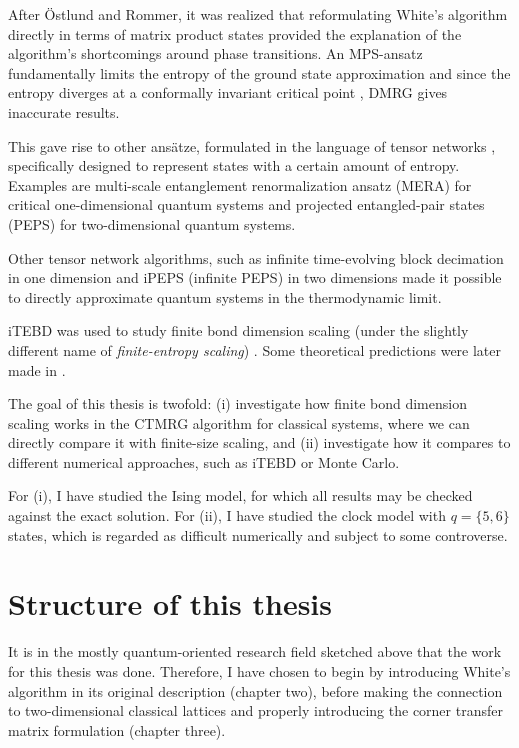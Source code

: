 After Östlund and Rommer, it was realized that reformulating White's
algorithm directly in terms of matrix product states provided the
explanation of the algorithm's shortcomings around phase transitions. An
MPS-ansatz fundamentally limits the entropy of the ground state
approximation and since the entropy diverges at a conformally invariant
critical point \cite{calabrese2004entanglement}, DMRG gives inaccurate
results.

This gave rise to other ansätze, formulated in the language of tensor
networks \cite{orus2014practical}, specifically designed to represent
states with a certain amount of entropy. Examples are multi-scale
entanglement renormalization ansatz (MERA) for critical one-dimensional
quantum systems \cite{vidal2007entanglement} and projected entangled-pair
states (PEPS) \cite{verstraete2004renormalization}
for two-dimensional quantum systems.

Other tensor network algorithms, such as infinite time-evolving block
decimation \cite{vidal2007classical} in one dimension and iPEPS (infinite
PEPS) \cite{jordan2008classical} in two dimensions made it possible to
directly approximate quantum systems in the thermodynamic limit.

iTEBD was used to study finite bond dimension scaling (under the slightly
different name of \emph{finite-entropy scaling})
\cite{tagliacozzo2008scaling}. Some theoretical predictions were later
made in \cite{pollmann2009theory}.

The goal of this thesis is twofold: (i) investigate how finite bond
dimension scaling works in the CTMRG algorithm for classical systems,
where we can directly compare it with finite-size scaling, and (ii)
investigate how it compares to different numerical approaches, such as
iTEBD or Monte Carlo.

For (i), I have studied the Ising model, for which all results may be checked
against the exact solution. For (ii), I have studied the clock model with $q
= \{5,
6 \}$ states, which is regarded as difficult numerically and subject to some
controverse.

\section{Structure of this thesis}

It is in the mostly quantum-oriented research field sketched above that the
work for this thesis was done. Therefore, I have chosen to
begin by introducing White's algorithm in its original description
(chapter two), before making the connection to two-dimensional classical
lattices and properly introducing the corner transfer matrix formulation
(chapter three).

